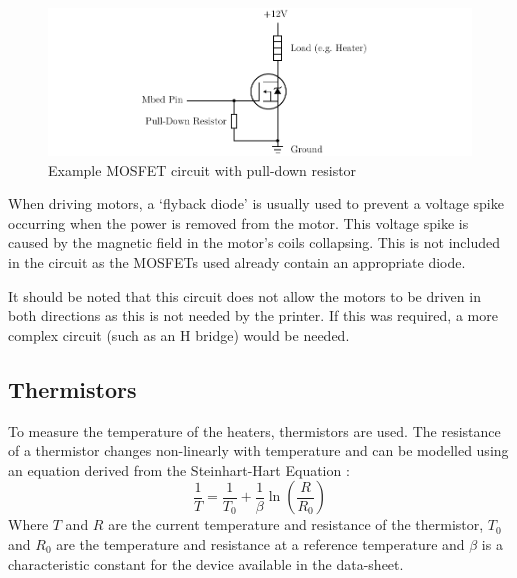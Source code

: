 			\begin{figure}
				\includegraphics[width=1\textwidth]{diagrams/mosfetUsage.pdf}
				\caption{Example MOSFET circuit with pull-down resistor}
				\label{fig:mosfetUsage}
			\end{figure}
			
			When driving motors, a `flyback diode' is usually used to prevent a
			voltage spike occurring when the power is removed from the motor. This
			voltage spike is caused by the magnetic field in the motor's coils
			collapsing. This is not included in the circuit as the MOSFETs used
			already contain an appropriate diode.
			
			It should be noted that this circuit does not allow the motors to be
			driven in both directions as this is not needed by the printer. If this
			was required, a more complex circuit (such as an H bridge) would be
			needed.
		
		\subsection{Thermistors}
			
			\label{sec:thermistor}
			
			To measure the temperature of the heaters, thermistors are used. The
			resistance of a thermistor changes non-linearly with temperature and can
			be modelled using an equation derived from the Steinhart-Hart
			Equation \cite{Steinhart1968497}:
			\begin{equation}
				\frac{1}{T} = \frac{1}{T_0} + \frac{1}{\beta} \ln \left( \frac{R}{R_0} \right)
				\label{equ:steinhart}
			\end{equation}
			Where $T$ and $R$ are the current temperature and resistance of the
			thermistor, $T_0$ and $R_0$ are the temperature and resistance at a
			reference temperature and $\beta$ is a characteristic constant for the
			device available in the data-sheet.
			
